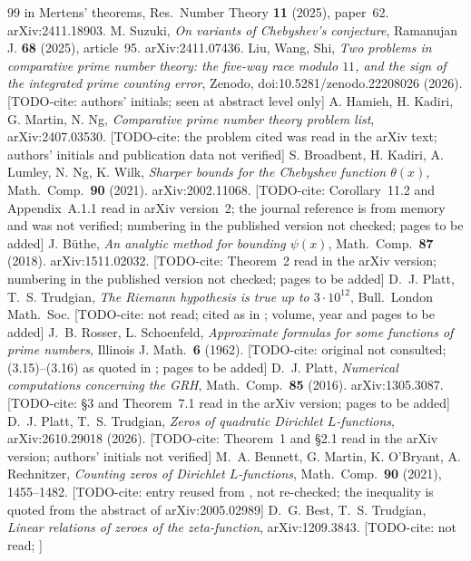 \documentclass[11pt]{amsart}
\theoremstyle{definition}
\numberwithin{equation}{section}
\newcommand{\todocite}[1]{\textsf{[TODO-cite: #1]}}
\begin{document}
\begin{thebibliography}{99}
{in Mertens' theorems}, Res.\ Number Theory \textbf{11} (2025),
paper~62. arXiv:2411.18903.
 M. Suzuki, \emph{On variants of Chebyshev's
conjecture}, Ramanujan J. \textbf{68} (2025), article~95.
arXiv:2411.07436.
 Liu, Wang, Shi, \emph{Two problems in comparative
prime number theory: the five-way race modulo $11$, and the sign of
the integrated prime counting error}, Zenodo,
doi:10.5281/zenodo.22208026 (2026). \todocite{authors' initials;
seen at abstract level only}
 A. Hamieh, H. Kadiri, G. Martin, N. Ng,
\emph{Comparative prime number theory problem list},
arXiv:2407.03530. \todocite{the problem cited was read in the arXiv
text; authors' initials and publication data not verified}
 S. Broadbent, H. Kadiri, A. Lumley, N. Ng, K. Wilk,
\emph{Sharper bounds for the Chebyshev function $\theta(x)$}, Math.\
Comp.\ \textbf{90} (2021). arXiv:2002.11068.
\todocite{Corollary~11.2 and Appendix~A.1.1 read in arXiv version~2;
the journal reference is from memory and was not verified; numbering
in the published version not checked; pages to be added}
 J. B\"uthe, \emph{An analytic method for bounding
$\psi(x)$}, Math.\ Comp.\ \textbf{87} (2018). arXiv:1511.02032.
\todocite{Theorem~2 read in the arXiv version; numbering in the
published version not checked; pages to be added}
 D.~J. Platt, T.~S. Trudgian, \emph{The Riemann
hypothesis is true up to $3\cdot10^{12}$}, Bull.\ London Math.\ Soc.
\todocite{not read; cited as in \cite{BKLNW21}; volume, year and
pages to be added}
 J.~B. Rosser, L. Schoenfeld, \emph{Approximate
formulas for some functions of prime numbers}, Illinois J. Math.\
\textbf{6} (1962). \todocite{original not consulted; (3.15)--(3.16)
as quoted in \cite[Lemma~2.2]{Joh23}; pages to be added}
\bibitem{Pla16} D.~J. Platt, \emph{Numerical computations concerning
the GRH}, Math.\ Comp.\ \textbf{85} (2016). arXiv:1305.3087.
\todocite{\S3 and Theorem~7.1 read in the arXiv version; pages to be
added}
\bibitem{PT26} D.~J. Platt, T.~S. Trudgian, \emph{Zeros of quadratic
Dirichlet $L$-functions}, arXiv:2610.29018 (2026).
\todocite{Theorem~1 and \S2.1 read in the arXiv version; authors'
initials not verified}
\bibitem{BMOR21} M.~A. Bennett, G. Martin, K. O'Bryant,
A. Rechnitzer, \emph{Counting zeros of Dirichlet $L$-functions},
Math.\ Comp.\ \textbf{90} (2021), 1455--1482.
\todocite{entry reused from \cite{WR}, not re-checked; the inequality
is quoted from the abstract of arXiv:2005.02989}
\bibitem{BT15} D.~G. Best, T.~S. Trudgian, \emph{Linear relations of
zeroes of the zeta-function}, arXiv:1209.3843. \todocite{not read;
}
\end{thebibliography}
\end{document}
